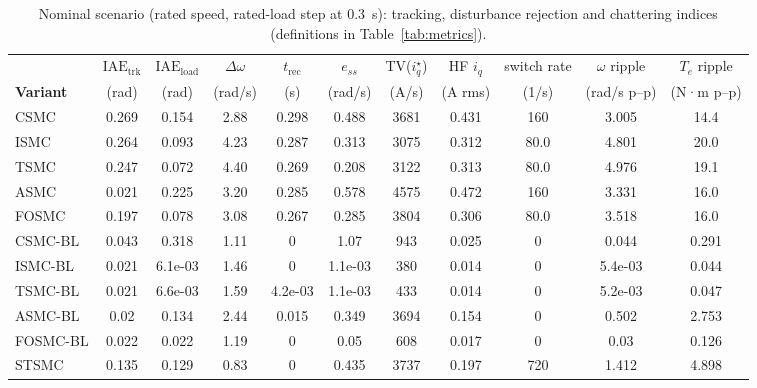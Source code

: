 \begin{table}[!t]
\centering
\caption{Nominal scenario (rated speed, rated-load step at 0.3~s): tracking, disturbance rejection and chattering indices (definitions in Table~\ref{tab:metrics}).}
\label{tab:nominal}
\small
\begin{tabular}{@{}lcccccccccc@{}}
\toprule
& $\mathrm{IAE}_{\text{trk}}$ & $\mathrm{IAE}_{\text{load}}$ & $\Delta\omega$ & $t_{\text{rec}}$ & $e_{ss}$ & TV($i_q^\star$) & HF $i_q$ & switch rate & $\omega$ ripple & $T_e$ ripple \\
\textbf{Variant} & (rad) & (rad) & (rad/s) & (s) & (rad/s) & (A/s) & (A rms) & (1/s) & (rad/s p--p) & (N·m p--p) \\
\midrule
CSMC & 0.269 & 0.154 & 2.88 & 0.298 & 0.488 & 3681 & 0.431 & 160 & 3.005 & 14.4 \\
ISMC & 0.264 & 0.093 & 4.23 & 0.287 & 0.313 & 3075 & 0.312 & 80.0 & 4.801 & 20.0 \\
TSMC & 0.247 & 0.072 & 4.40 & 0.269 & 0.208 & 3122 & 0.313 & 80.0 & 4.976 & 19.1 \\
ASMC & 0.021 & 0.225 & 3.20 & 0.285 & 0.578 & 4575 & 0.472 & 160 & 3.331 & 16.0 \\
FOSMC & 0.197 & 0.078 & 3.08 & 0.267 & 0.285 & 3804 & 0.306 & 80.0 & 3.518 & 16.0 \\
CSMC-BL & 0.043 & 0.318 & 1.11 & 0 & 1.07 & 943 & 0.025 & 0 & 0.044 & 0.291 \\
ISMC-BL & 0.021 & 6.1e-03 & 1.46 & 0 & 1.1e-03 & 380 & 0.014 & 0 & 5.4e-03 & 0.044 \\
TSMC-BL & 0.021 & 6.6e-03 & 1.59 & 4.2e-03 & 1.1e-03 & 433 & 0.014 & 0 & 5.2e-03 & 0.047 \\
ASMC-BL & 0.02 & 0.134 & 2.44 & 0.015 & 0.349 & 3694 & 0.154 & 0 & 0.502 & 2.753 \\
FOSMC-BL & 0.022 & 0.022 & 1.19 & 0 & 0.05 & 608 & 0.017 & 0 & 0.03 & 0.126 \\
STSMC & 0.135 & 0.129 & 0.83 & 0 & 0.435 & 3737 & 0.197 & 720 & 1.412 & 4.898 \\
\bottomrule
\end{tabular}
\end{table}
